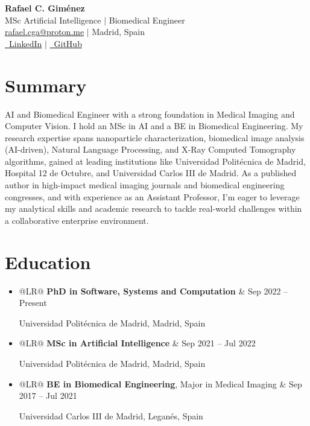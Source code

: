 \documentclass[letterpaper,10pt]{article}
\makeatletter
\newcommand{\dateitem}[2]{
    \item
    \noindent
    \begin{tabularx}{\linewidth}{@{}LR@{}}
        #1 & #2 \\
    \end{tabularx}
    \par
}
\makeatother
\begin{document}
\begin{center}
    \vspace{-1cm} %
    \color{headerblue}
    {\Huge \bfseries Rafael C. Giménez} \\
    \vspace{5pt}
    \normalsize
    MSc Artificial Intelligence $|$ Biomedical Engineer \\
    \vspace{5pt}
    \color{textgray}
    \href{mailto:rafael.cga@proton.me}{rafael.cga@proton.me} $|$ Madrid, Spain \\
    \vspace{3pt}
    \href{https://www.linkedin.com/in/rafaelcga/}{\faLinkedin\ LinkedIn} $|$ \href{https://github.com/rafaelcga}{\faGithub\ GitHub} \\
\end{center}
\vspace{5pt} %

\section*{Summary}
\vspace{5pt}
\color{textgray}
AI and Biomedical Engineer with a strong foundation in Medical Imaging and Computer Vision. I hold an MSc in AI and a BE in Biomedical Engineering. My research expertise spans nanoparticle characterization, biomedical image analysis (AI-driven), Natural Language Processing, and X-Ray Computed Tomography algorithms, gained at leading institutions like Universidad Politécnica de Madrid, Hospital 12 de Octubre, and Universidad Carlos III de Madrid. As a published author in high-impact medical imaging journals and biomedical engineering congresses, and with experience as an Assistant Professor, I'm eager to leverage my analytical skills and academic research to tackle real-world challenges within a collaborative enterprise environment.

\section*{Education}
\vspace{5pt}
\color{textgray}
\begin{itemize}
    \dateitem{\textbf{PhD in Software, Systems and Computation}}{Sep 2022 -- Present}
        Universidad Politécnica de Madrid, Madrid, Spain
    \dateitem{\textbf{MSc in Artificial Intelligence}}{Sep 2021 -- Jul 2022}
        Universidad Politécnica de Madrid, Madrid, Spain
    \dateitem{\textbf{BE in Biomedical Engineering}, Major in Medical Imaging}{Sep 2017 -- Jul 2021}
        Universidad Carlos III de Madrid, Leganés, Spain
\end{itemize}
\end{document}
